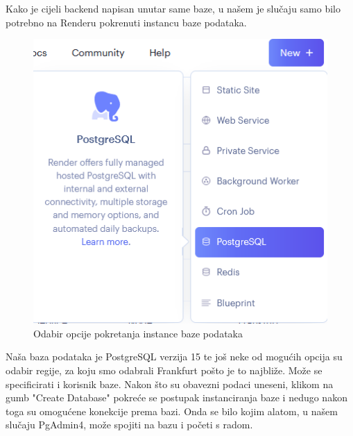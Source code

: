 				Kako je cijeli backend napisan unutar same baze, u našem je slučaju samo bilo potrebno na Renderu pokrenuti instancu baze podataka. 
				\begin{figure}[H]
					\centering
					\includegraphics[width=\textwidth]{slike/render_new_instance.png}
					\caption{Odabir opcije pokretanja instance baze podataka}
					\label{fig: Render new instance}
				\end{figure}
				Naša baza podataka je PostgreSQL verzija 15 te još neke od mogućih opcija su odabir regije, za koju smo odabrali Frankfurt pošto je to najbliže. Može se specificirati i korisnik baze. Nakon što su obavezni podaci uneseni, klikom na gumb "Create Database" pokreće se postupak instanciranja baze i nedugo nakon toga su omogućene konekcije prema bazi. Onda se bilo kojim alatom, u našem slučaju PgAdmin4, može spojiti na bazu i početi s radom.
